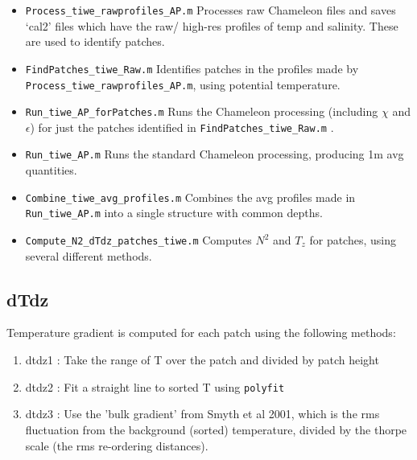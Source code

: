 \documentclass[11pt]{article}
\begin{document}
\begin{itemize}

\item \verb+Process_tiwe_rawprofiles_AP.m+  Processes raw Chameleon files and saves `cal2' files which have the raw/ high-res profiles of temp and salinity. These are used to identify patches.

\item \verb+FindPatches_tiwe_Raw.m+ Identifies patches in the profiles made by \verb+Process_tiwe_rawprofiles_AP.m+, using potential temperature.

\item \verb+Run_tiwe_AP_forPatches.m+ Runs the Chameleon processing (including $\chi$ and $\epsilon$) for just the patches identified in \verb+FindPatches_tiwe_Raw.m+ .

\item \verb+Run_tiwe_AP.m+ Runs the standard Chameleon processing, producing 1m avg quantities.

\item \verb+Combine_tiwe_avg_profiles.m+ Combines the avg profiles made in \verb+Run_tiwe_AP.m+ into a single structure with common depths.

\item \verb+Compute_N2_dTdz_patches_tiwe.m+ Computes $N^2$ and $T_z$ for patches, using several different methods.

\end{itemize}

\medskip


\subsection{dTdz}

Temperature gradient is computed for each patch using the following methods:
\begin{enumerate}
\item dtdz1 : Take the range of T over the patch and divided by patch height
\item dtdz2 : Fit a straight line to sorted T using \verb+polyfit+
\item dtdz3 : Use the 'bulk gradient' from Smyth et al 2001, which is the rms fluctuation from the background (sorted) temperature, divided by the thorpe scale (the rms re-ordering distances).
\end{enumerate}
\end{document}
